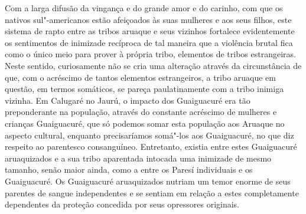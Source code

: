 Com a larga difusão da vingança e do grande amor e do carinho, com que
os nativos 
sul"-americanos estão afeiçoados às suas mulheres e aos seus filhos, este sistema de rapto entre as tribos aruaque e seus vizinhos fortalece evidentemente os sentimentos de inimizade recíproca de tal
maneira que a violência brutal fica como o único meio para prover à
própria tribo, elementos de tribos estrangeiras. Neste sentido,
curiosamente não se cria uma alteração através da circunstância de que,
com o acréscimo de tantos elementos estrangeiros, a tribo aruaque em
questão, em termos somáticos, se pareça paulatinamente com a tribo
inimiga vizinha. Em Calugaré no Jaurú, o impacto dos Guaiguacuré era tão
preponderante na população, através do constante acréscimo de mulheres e
crianças Guaiguacuré, que só podemos somar esta população aos Aruaque no
aspecto cultural, enquanto precisaríamos somá"-los aos Guaiguacuré, no
que diz respeito ao parentesco consanguíneo. Entretanto, existia entre
estes Guaiguacuré aruaquizados e a sua tribo aparentada intocada uma
inimizade de mesmo tamanho, senão maior ainda, como a entre os Paresí
individuais e os Guaiguacuré. Os Guaiguacuré aruaquizados nutriam um
temor enorme de seus parentes de sangue independentes e se sentiam em
relação a estes completamente dependentes da proteção concedida por seus
opressores originais.


